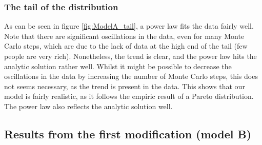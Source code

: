 \documentclass[a4paper, 10pt]{article}
\begin{document}
\subsubsection{The tail of the distribution}
As can be seen in figure \ref{fig:ModelA_tail}, a power law fits the data fairly well. Note that there are significant oscillations in the data, even for many Monte Carlo steps, which are due to the lack of data at the high end of the tail (few people are very rich). Nonetheless, the trend is clear, and the power law hits the analytic solution rather well. Whilst it might be possible to decrease the oscillations in the data by increasing the number of Monte Carlo steps, this does not seems necessary, as the trend is present in the data. This shows that our model is fairly realistic, as it follows the empiric result of a Pareto distribution. The power law also reflects the analytic solution well.

\subsection{Results from the first modification (model B)}
\end{document}
